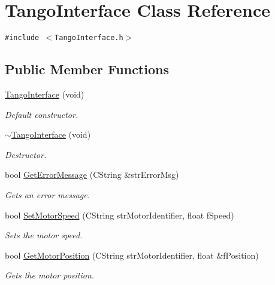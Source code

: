 \hypertarget{classTangoInterface}{
\section{TangoInterface Class Reference}
\label{classTangoInterface}
}
{\tt \#include $<$TangoInterface.h$>$}

\subsection*{Public Member Functions}
\begin{CompactItemize}
\item 
\hyperlink{classTangoInterface_075eeb694387d0a1621cfdcfe06d222f}{TangoInterface} (void)
\begin{CompactList}\small\item\em Default constructor. \item\end{CompactList}\item 
\hyperlink{classTangoInterface_6af2d055005412be8ad30be0eada083b}{$\sim$TangoInterface} (void)
\begin{CompactList}\small\item\em Destructor. \item\end{CompactList}\item 
bool \hyperlink{classTangoInterface_e4c5af1c2055bdd253eddce0babd9158}{GetErrorMessage} (CString \&strErrorMsg)
\begin{CompactList}\small\item\em Gets an error message. \item\end{CompactList}\item 
bool \hyperlink{classTangoInterface_45f902f0d486ff896b49de74d2e60a02}{SetMotorSpeed} (CString strMotorIdentifier, float fSpeed)
\begin{CompactList}\small\item\em Sets the motor speed. \item\end{CompactList}\item 
bool \hyperlink{classTangoInterface_c14b1a6b2d195d30a26b02fdffd81428}{GetMotorPosition} (CString strMotorIdentifier, float \&fPosition)
\begin{CompactList}\small\item\em Gets the motor position. \item\end{CompactList}\item 

\end{CompactItemize}

